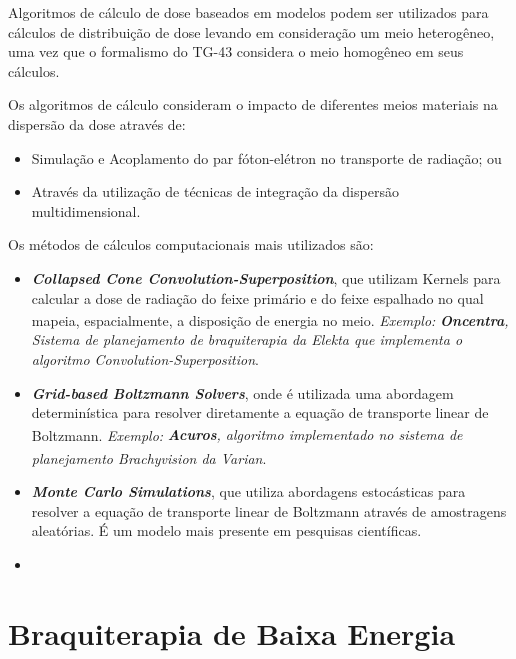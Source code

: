 \documentclass[11pt,a4paper]{article}
\begin{document}
			Algoritmos de cálculo de dose baseados em modelos podem ser utilizados para cálculos de distribuição de dose levando em consideração um meio heterogêneo, uma vez que o formalismo do TG-43 considera o meio homogêneo em seus cálculos.
			
			Os algoritmos de cálculo consideram o impacto de diferentes meios materiais na dispersão da dose através de:

				\begin{itemize}
					\item Simulação e Acoplamento do par fóton-elétron no transporte de radiação; ou
					\item Através da utilização de técnicas de integração da dispersão multidimensional.
				\end{itemize}
			
			Os métodos de cálculos computacionais mais utilizados são:

				\begin{itemize}
					\item \textbf{\textit{\textcolor{CarnationPink}{Collapsed Cone Convolution-Superposition}}}, que utilizam Kernels para calcular a dose de radiação do feixe primário e do feixe espalhado no qual mapeia, espacialmente, a disposição de energia no meio. \textit{Exemplo:} \textit{\textbf{Oncentra\textsuperscript{\textregistered}}, Sistema de planejamento de braquiterapia da Elekta que implementa o algoritmo Convolution-Superposition}.
					
					\item \textbf{\textit{\textcolor{CarnationPink}{Grid-based Boltzmann Solvers}}}, onde é utilizada uma abordagem determinística para resolver diretamente a equação de transporte linear de Boltzmann. \textit{Exemplo:} \textit{\textbf{Acuros\textsuperscript{\textregistered}}, algoritmo implementado no sistema de planejamento Brachyvision\textsuperscript{\textregistered} da Varian}.
					
					\item \textbf{\textit{\textcolor{CarnationPink}{Monte Carlo Simulations}}}, que utiliza abordagens estocásticas para resolver a equação de transporte linear de Boltzmann através de amostragens aleatórias. É um modelo mais presente em pesquisas científicas.
					
					\item \end{itemize}
		
	\section{Braquiterapia de Baixa Energia}
		
\end{document}
